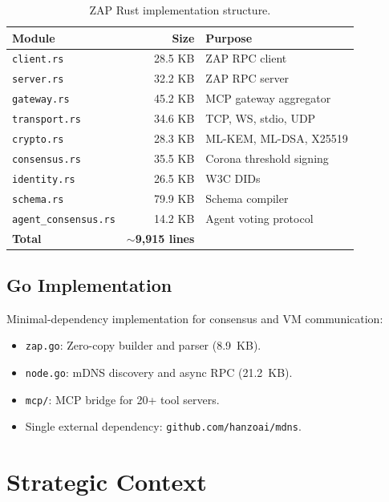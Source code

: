 \documentclass[11pt,letterpaper]{article}
\begin{document}
\begin{table}[H]
\centering
\begin{tabular}{@{}lrp{5cm}@{}}
\toprule
\textbf{Module} & \textbf{Size} & \textbf{Purpose} \\
\midrule
\texttt{client.rs} & 28.5 KB & ZAP RPC client \\
\texttt{server.rs} & 32.2 KB & ZAP RPC server \\
\texttt{gateway.rs} & 45.2 KB & MCP gateway aggregator \\
\texttt{transport.rs} & 34.6 KB & TCP, WS, stdio, UDP \\
\texttt{crypto.rs} & 28.3 KB & ML-KEM, ML-DSA, X25519 \\
\texttt{consensus.rs} & 35.5 KB & Corona threshold signing \\
\texttt{identity.rs} & 26.5 KB & W3C DIDs \\
\texttt{schema.rs} & 79.9 KB & Schema compiler \\
\texttt{agent\_consensus.rs} & 14.2 KB & Agent voting protocol \\
\midrule
\textbf{Total} & \textbf{$\sim$9,915 lines} & \\
\bottomrule
\end{tabular}
\caption{ZAP Rust implementation structure.}
\label{tab:rust-impl}
\end{table}

\subsection{Go Implementation}

Minimal-dependency implementation for consensus and VM communication:

\begin{itemize}
\item \texttt{zap.go}: Zero-copy builder and parser (8.9~KB).
\item \texttt{node.go}: mDNS discovery and async RPC (21.2~KB).
\item \texttt{mcp/}: MCP bridge for 20+ tool servers.
\item Single external dependency: \texttt{github.com/hanzoai/mdns}.
\end{itemize}

\section{Strategic Context}
\end{document}
